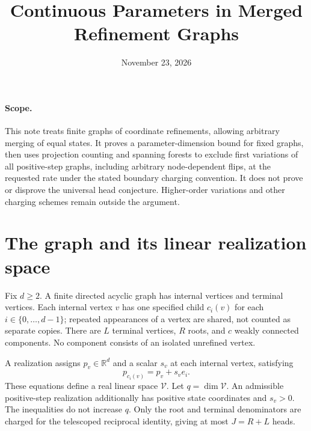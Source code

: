 \documentclass[11pt]{article}
\title{Continuous Parameters in Merged Refinement Graphs}
\author{}
\date{November 23, 2026}
\begin{document}
\maketitle

\paragraph{Scope.}
This note treats finite graphs of coordinate refinements, allowing
arbitrary merging of equal states. It proves a parameter-dimension bound
for fixed graphs, then uses projection counting and spanning forests to
exclude first variations of all positive-step graphs, including arbitrary
node-dependent flips, at the requested rate under the stated boundary
charging convention. It does not prove or disprove the universal head
conjecture. Higher-order variations and other charging schemes remain
outside the argument.

\section{The graph and its linear realization space}

Fix $d\ge2$. A finite directed acyclic graph has internal vertices and
terminal vertices. Each internal vertex $v$ has one specified child
$c_i(v)$ for each $i\in\{0,\ldots,d-1\}$; repeated appearances of a
vertex are shared, not counted as separate copies. There are $L$ terminal
vertices, $R$ roots, and $c$ weakly connected components. No component
consists of an isolated unrefined vertex.

A realization assigns $p_v\in\mathbb R^d$ and a scalar $s_v$ at each
internal vertex, satisfying
\[
                      p_{c_i(v)}=p_v+s_v e_i.
 \tag{1}
\]
These equations define a real linear space $\mathcal V$. Let
$q=\dim\mathcal V$. An admissible positive-step realization additionally
has positive state coordinates and $s_v>0$. The inequalities do not
increase $q$. Only the root and terminal denominators are charged for
the telescoped reciprocal identity, giving at most $J=R+L$ heads.
\end{document}
